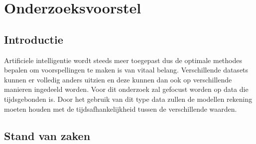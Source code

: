 \chapter{Onderzoeksvoorstel}
\label{ch:Onderzoeksvoorstel}


\section{Introductie} %
\label{sec:introductie}




Artificiele intelligentie wordt steeds meer toegepast dus de optimale methodes bepalen om voorspellingen te maken is van vitaal belang. Verschillende datasets kunnen er volledig anders uitzien en deze kunnen dan ook op verschillende manieren ingedeeld worden. Voor dit onderzoek zal gefocust worden op data die tijdsgebonden is. Door het gebruik van dit type data zullen de modellen rekening moeten houden met de tijdsafhankelijkheid tussen de verschillende waarden.


\section{Stand van zaken}
\label{sec:stand-van-zaken}


